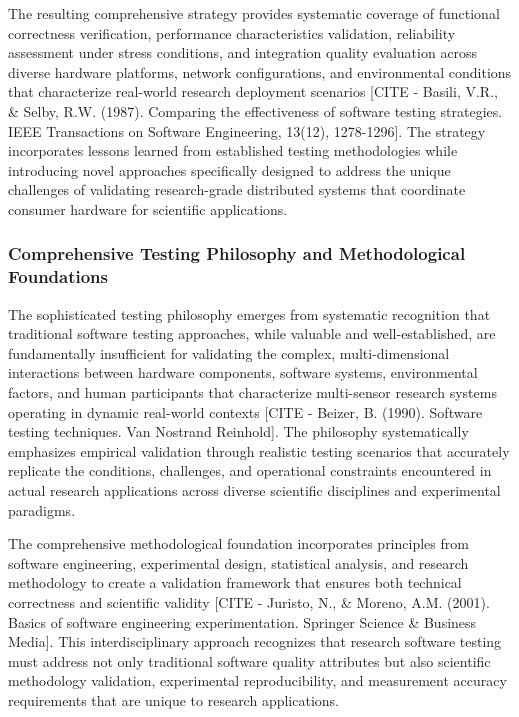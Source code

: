 \documentclass[11pt,a4paper]{report}
\begin{document}
The resulting comprehensive strategy provides systematic coverage of functional correctness verification, performance
characteristics validation, reliability assessment under stress conditions, and integration quality evaluation across
diverse hardware platforms, network configurations, and environmental conditions that characterize real-world research
deployment
scenarios [CITE - Basili, V.R., \& Selby, R.W. (1987). Comparing the effectiveness of software testing strategies. IEEE Transactions on Software Engineering, 13(12), 1278-1296].
The strategy incorporates lessons learned from established testing methodologies while introducing novel approaches
specifically designed to address the unique challenges of validating research-grade distributed systems that coordinate
consumer hardware for scientific applications.

\subsubsection{Comprehensive Testing Philosophy and Methodological Foundations}

The sophisticated testing philosophy emerges from systematic recognition that traditional software testing approaches,
while valuable and well-established, are fundamentally insufficient for validating the complex, multi-dimensional
interactions between hardware components, software systems, environmental factors, and human participants that
characterize multi-sensor research systems operating in dynamic real-world
contexts [CITE - Beizer, B. (1990). Software testing techniques. Van Nostrand Reinhold]. The philosophy systematically
emphasizes empirical validation through realistic testing scenarios that accurately replicate the conditions,
challenges, and operational constraints encountered in actual research applications across diverse scientific
disciplines and experimental paradigms.

The comprehensive methodological foundation incorporates principles from software engineering, experimental design,
statistical analysis, and research methodology to create a validation framework that ensures both technical correctness
and scientific
validity [CITE - Juristo, N., \& Moreno, A.M. (2001). Basics of software engineering experimentation. Springer Science \& Business Media].
This interdisciplinary approach recognizes that research software testing must address not only traditional software
quality attributes but also scientific methodology validation, experimental reproducibility, and measurement accuracy
requirements that are unique to research applications.
\end{document}
